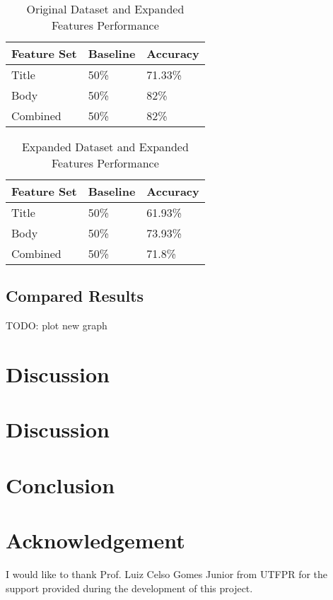 \documentclass[conference]{IEEEtran}
\begin{document}
\begin{table}[htbp]
\caption{Original Dataset and Expanded Features Performance}
\begin{center}
\begin{tabular}{ |l|l|l| }
\hline
Feature Set & Baseline & Accuracy \\
\hline
Title & 50\% & 71.33\% \\
\hline
Body & 50\% & 82\% \\
\hline
Combined & 50\% & 82\% \\
\hline
\end{tabular}
\label{table:od_ef}
\end{center}
\end{table}

\begin{table}[htbp]
\caption{Expanded Dataset and Expanded Features Performance}
\begin{center}
\begin{tabular}{ |l|l|l| }
\hline
Feature Set & Baseline & Accuracy \\
\hline
Title & 50\% & 61.93\% \\
\hline
Body & 50\% & 73.93\% \\
\hline
Combined & 50\% & 71.8\% \\
\hline
\end{tabular}
\label{table:ed_ef}
\end{center}
\end{table}

\subsection{Compared Results}

TODO: plot new graph

\section{Discussion}
\label{section:discussion}

\section{Discussion}
\label{section:discussion}

\section{Conclusion}


\section*{Acknowledgement}
I would like to thank Prof. Luiz Celso Gomes Junior from UTFPR for the support
provided during the development of this project.



\end{document}
